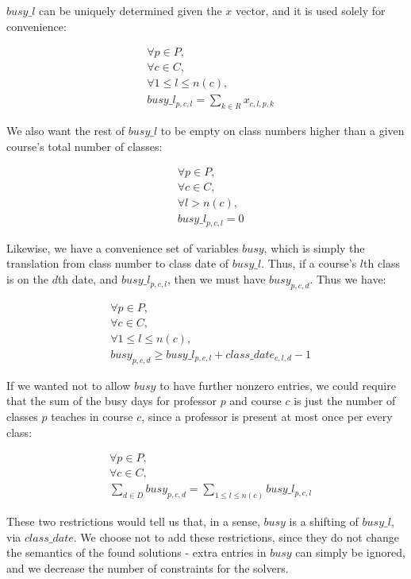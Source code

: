 $busy\_l$ can be uniquely determined given the $x$ vector, and it is used solely for convenience:

\begin{align}
  &\forall p \in P,\\
  &\forall c \in C,\\
  &\forall 1\le l \le n(c),\\
  &busy\_l_{p, c, l} = \sum_{k \in R} x_{c, l, p, k}
\end{align}

We also want the rest of $busy\_l$ to be empty on class numbers higher than a given course's total number of classes:

\begin{align}
  &\forall p \in P,\\
  &\forall c \in C,\\
  &\forall l > n(c),\\
  &busy\_l_{p, c, l} = 0
\end{align}

Likewise, we have a convenience set of variables $busy$, which is simply the translation from class number to class date of $busy\_l$. Thus, if a course's $l$th class is on the $d$th date, and $busy\_l_{p, c, l}$, then we must have $busy_{p, c, d}$. Thus we have:

\begin{align}
  &\forall p \in P,\\
  &\forall c \in C,\\
  &\forall 1 \le l \le n(c),\\
  &busy_{p, c, d} \ge busy\_l_{p, c, l} + class\_date_{c, l, d} - 1
\end{align}

If we wanted not to allow $busy$ to have further nonzero entries, we could require that the sum of the busy days for professor $p$ and course $c$ is just the number of classes $p$ teaches in course $c$, since a professor is present at most once per every class:

\begin{align}
  &\forall p \in P,\\
  &\forall c \in C,\\
  &\sum_{d \in D} busy_{p, c, d} = \sum_{1 \le l \le n(c)} busy\_l_{p, c, l}
\end{align}

These two restrictions would tell us that, in a sense, $busy$ is a shifting of $busy\_l$, via $class\_date$. We choose not to add these restrictions, since they do not change the semantics of the found solutions - extra entries in $busy$ can simply be ignored, and we decrease the number of constraints for the solvers.
